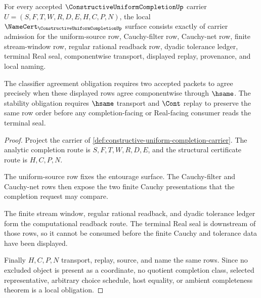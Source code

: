 \begin{theorem}
\label{thm:constructive-uniform-completion-namecert-obligations}
For every accepted $\ConstructiveUniformCompletionUp$ carrier $U=(S,F,T,W,R,D,E,H,C,P,N)$, the local $\NameCert_{\ConstructiveUniformCompletionUp}$ surface consists exactly of carrier admission for the uniform-source row, Cauchy-filter row, Cauchy-net row, finite stream-window row, regular rational readback row, dyadic tolerance ledger, terminal Real seal, componentwise transport, displayed replay, provenance, and local naming.

The classifier agreement obligation requires two accepted packets to agree precisely when these displayed rows agree componentwise through $\hsame$. The stability obligation requires $\hsame$ transport and $\Cont$ replay to preserve the same row order before any completion-facing or Real-facing consumer reads the terminal seal.
\end{theorem}
\begin{proof}
Project the carrier of \autoref{def:constructive-uniform-completion-carrier}. The analytic completion route is $S,F,T,W,R,D,E$, and the structural certificate route is $H,C,P,N$.

The uniform-source row fixes the entourage surface. The Cauchy-filter and Cauchy-net rows then expose the two finite Cauchy presentations that the completion request may compare.

The finite stream window, regular rational readback, and dyadic tolerance ledger form the computational readback route. The terminal Real seal is downstream of those rows, so it cannot be consumed before the finite Cauchy and tolerance data have been displayed.

Finally $H,C,P,N$ transport, replay, source, and name the same rows. Since no excluded object is present as a coordinate, no quotient completion class, selected representative, arbitrary choice schedule, host equality, or ambient completeness theorem is a local obligation.
\end{proof}

